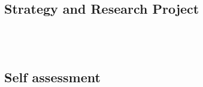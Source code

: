 \ \\


\ \\


\subsection{Strategy and Research Project} %
\label{sub:hadas_strategy_and_research_project}



\ \\


\ \\


\subsection{Self assessment} %
\label{sub:hadas_self_assesment}




\ \\


\ \\



